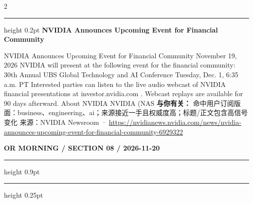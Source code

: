 \documentclass[10.5pt]{ctexart}
\begin{document}
\begin{multicols}{2}
\vspace{2mm}
\hrule height 0.2pt
\vspace{2mm}
{\large\bfseries NVIDIA Announces Upcoming Event for Financial Community}\par
NVIDIA Announces Upcoming Event for Financial Community November 19, 2026 NVIDIA will present at the following event for the financial community: 30th Annual UBS Global Technology and AI Conference Tuesday, Dec. 1, 6:35 a.m. PT Interested parties can listen to the live audio webcast of NVIDIA financial presentations at investor.nvidia.com . Webcast replays are available for 90 days afterward. About NVIDIA NVIDIA (NAS
\textbf{与你有关：} 命中用户订阅版面：business、engineering、ai；来源接近一手且权威度高；标题/正文包含高信号变化
{\footnotesize\color{ormuted} 来源：NVIDIA Newsroom · \url{https://nvidianews.nvidia.com/news/nvidia-announces-upcoming-event-for-financial-community-6929322}}
\end{multicols}
\newpage
{\small\bfseries OR MORNING / SECTION 08 / 2026-11-20}
\vspace{2mm}
\hrule height 0.9pt
\vspace{1.5mm}
\hrule height 0.25pt
\vspace{4mm}
\end{document}
